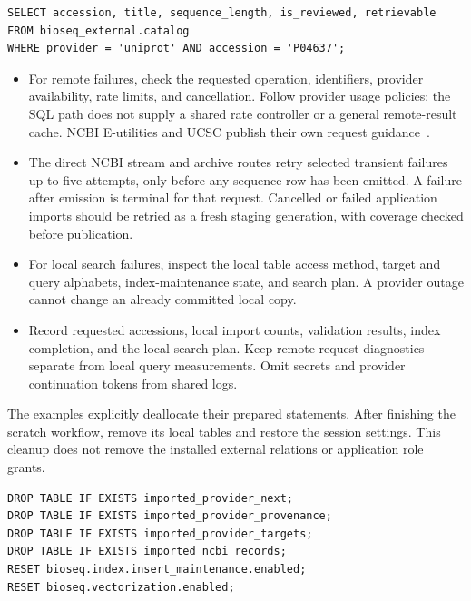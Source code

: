 \par\noindent\begin{minipage}{\linewidth}
\begin{lstlisting}[style=bioseq-appendix-sql]
SELECT accession, title, sequence_length, is_reviewed, retrievable
FROM bioseq_external.catalog
WHERE provider = 'uniprot' AND accession = 'P04637';
\end{lstlisting}
\end{minipage}

\begin{itemize}
  \item For remote failures, check the requested operation, identifiers,
        provider availability, rate limits, and cancellation. Follow provider
        usage policies: the SQL path does not supply a shared rate controller
        or a general remote-result cache. NCBI E-utilities and UCSC publish
        their own request guidance~\autocite{ncbiEutilitiesUsage,ucsc_rest_api}.
  \item The direct NCBI stream and archive routes retry selected transient
        failures up to five attempts, only before any sequence row has been
        emitted. A failure after emission is terminal for that request.
        Cancelled or failed application imports should be retried as a fresh
        staging generation, with coverage checked before publication.
  \item For local search failures, inspect the local table access method,
        target and query alphabets, index-maintenance state, and search plan.
        A provider outage cannot change an already committed local copy.
  \item Record requested accessions, local import counts, validation results,
        index completion, and the local search plan. Keep remote request
        diagnostics separate from local query measurements. Omit secrets and
        provider continuation tokens from shared logs.
\end{itemize}

The examples explicitly deallocate their prepared statements. After finishing
the scratch workflow, remove its local tables and restore the session settings.
This cleanup does not remove the installed external relations or application
role grants.

\par\noindent\begin{minipage}{\linewidth}
\begin{lstlisting}[style=bioseq-appendix-sql]
DROP TABLE IF EXISTS imported_provider_next;
DROP TABLE IF EXISTS imported_provider_provenance;
DROP TABLE IF EXISTS imported_provider_targets;
DROP TABLE IF EXISTS imported_ncbi_records;
RESET bioseq.index.insert_maintenance.enabled;
RESET bioseq.vectorization.enabled;
\end{lstlisting}
\end{minipage}
